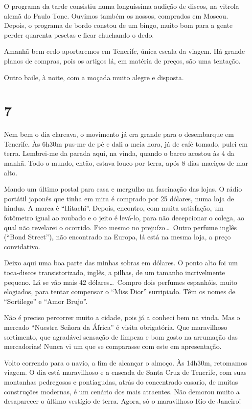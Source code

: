 O programa da tarde consistiu numa longuíssima audição de discos, na vitrola alemã do Paulo Tone. Ouvimos também os nossos, comprados em Moscou. Depois, o programa de bordo constou de um bingo, muito bom para a gente perder quarenta pesetas e ficar chuchando o dedo.

Amanhã bem cedo aportaremos em Tenerife, única escala da viagem. Há grande planos de compras, pois os artigos lá, em matéria de preços, são uma tentação.

Outro baile, à noite, com a moçada muito alegre e disposta.

\section*{7 \adfflatleafright {}}
Nem bem o dia clareava, o movimento já era grande para o desembarque em Tenerife. Às 6h30m pus-me de pé e dali a meia hora, já de café tomado, pulei em terra. Lembrei-me da parada aqui, na vinda, quando o barco acostou às 4 da manhã. Todo o mundo, então, estava louco por terra, após 8 dias maciços de mar alto.

Mando um último postal para casa e mergulho na fascinação das lojas. O rádio portátil japonês que tinha em mira é comprado por 25 dólares, numa loja de hindus. A marca é ``Hitachi''. Depois, encontro, com muita satisfação, um fotômetro igual ao roubado e o jeito é levá-lo, para não decepcionar o colega, ao qual não revelarei o ocorrido. Fico mesmo no prejuízo\ldots\ Outro perfume inglês (``Bond Street''), não encontrado na Europa, lá está na mesma loja, a preço convidativo.

Deixo aqui uma boa parte das minhas sobras em dólares. O ponto alto foi um toca-discos transistorizado, inglês, a pilhas, de um tamanho incrivelmente pequeno. Lá se vão mais 42 dólares\ldots\ Compro dois perfumes espanhóis, muito elogiados, para tentar compensar o ``Miss Dior'' surripiado. Têm os nomes de ``Sortilege'' e ``Amor Brujo''.

Não é preciso percorrer muito a cidade, pois já a conheci bem na vinda. Mas o mercado ``Nuestra Señora da África'' é visita obrigatória. Que maravilhoso sortimento, que agradável sensação de limpeza e bom gosto na arrumação das mercadorias! Nunca vi um que se comparasse com este em apresentação.

Volto correndo para o navio, a fim de alcançar o almoço. Às 14h30m, retomamos viagem. O dia está maravilhoso e a enseada de Santa Cruz de Tenerife, com suas montanhas pedregosas e pontiagudas, atrás do concentrado casario, de muitas construções modernas, é um cenário dos mais atraentes. Não demorou muito a desaparecer o último vestígio de terra. Agora, só o maravilhoso Rio de Janeiro!

